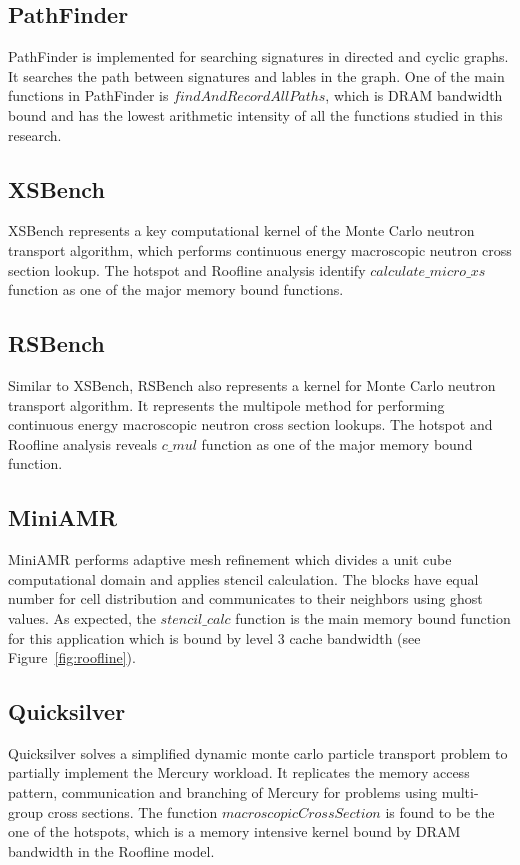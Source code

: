 \subsection{PathFinder}
PathFinder is implemented for searching signatures in directed and cyclic graphs. It searches the path between signatures and lables in the graph. One of the main functions in PathFinder is $findAndRecordAllPaths$, which is DRAM bandwidth bound and has the lowest arithmetic intensity of all the functions studied in this research. 

\subsection{XSBench}
XSBench represents a key computational kernel of the Monte Carlo neutron transport algorithm, which performs continuous energy macroscopic neutron cross section lookup. The hotspot and Roofline analysis identify $calculate\_micro\_xs$ function as one of the major memory bound functions. 

\subsection{RSBench}
Similar to XSBench, RSBench also represents a kernel for Monte Carlo neutron transport algorithm. It represents the multipole method for performing continuous energy macroscopic neutron cross section lookups. The hotspot and Roofline analysis reveals $c\_mul$ function as one of the major memory bound function.


\subsection{MiniAMR}
MiniAMR performs adaptive mesh refinement which divides a unit cube computational domain and applies stencil calculation. The blocks have equal number for cell distribution and communicates to their neighbors using ghost values. As expected, the $stencil\_calc$ function is the main memory bound function for this application which is bound by level 3 cache bandwidth (see Figure~\ref{fig:roofline}). 

\subsection{Quicksilver}
Quicksilver solves a simpliﬁed dynamic monte carlo particle transport problem to partially implement the Mercury workload. It replicates the memory access pattern, communication and branching of Mercury for problems using multi-group cross sections. The function $macroscopicCrossSection$ is found to be the one of the hotspots, which is a memory intensive kernel bound by DRAM bandwidth in the Roofline model.

